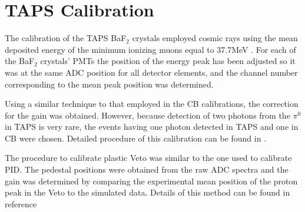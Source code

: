 \section{TAPS Calibration}

\indent The calibration of the TAPS BaF$_{2}$ crystals employed cosmic rays using the mean deposited energy of the minimum ionizing muons equal to 37.7MeV \cite{roebig}. For each of the BaF$_{2}$ crystals' PMTs the position of the energy peak has been adjusted so it was at the same ADC position for all detector elements, and the channel number corresponding to the mean peak position was determined.

\indent Using a similar technique to that employed in the CB calibrations, the correction for the gain was obtained. However, because detection of two photons from the $\pi^{0}$ in TAPS is very rare, the events having one photon detected in TAPS and one in CB were chosen. Detailed procedure of this calibration can be found in \cite{lemmer}.

\indent The procedure to calibrate plastic Veto was similar to the one used to calibrate PID. The pedestal positions were obtained from the raw ADC spectra and the gain was determined by comparing the experimental mean position of the proton peak in the Veto to the simulated data. Details of this method can be found in reference \cite{gessler}



   



